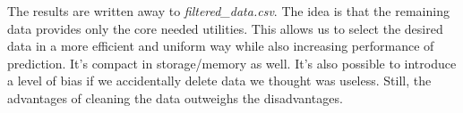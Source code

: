 The results are written away to \textit{filtered\_data.csv}. The idea is that the remaining data provides only the core needed utilities. This allows us to select the desired data in a more efficient and uniform way while also increasing performance of prediction. It's compact in storage/memory as well. It's also possible to introduce a level of bias if we accidentally delete data we thought was useless.  Still, the advantages of cleaning the data outweighs the disadvantages.



